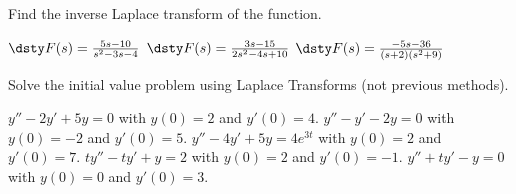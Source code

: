 \clearpage

\ii Find the inverse Laplace transform of the function.\label{17problem5}

\bb
\ii $\dsty F(s) = \frac{5s-10}{s^2-3s-4}$ \label{17problem5a}
\vfill
\ii $\dsty F(s) = \frac{3s-15}{2s^2-4s+10}$ \label{17problem5b}
\vfill
\ii $\dsty F(s) = \frac{-5s-36}{(s+2)(s^2+9)}$ \label{17problem5c}
\vfill
\ee

\clearpage
{}

\ii Solve the initial value problem using Laplace Transforms (not previous methods).  \label{17problem6}

\bb
\ii $y''-2y'+5y=0$ with $y(0)=2$ and $y'(0)=4$. \label{17problem6a}
\vfill
\ii $y''-y'-2y=0$ with $y(0)=-2$ and $y'(0)=5$. \label{17problem6b} %
\vfill
\clearpage
\ii $y''-4y'+5y=4e^{3t}$ with $y(0)=2$ and $y'(0)=7$. \label{17problem6c} %
\vfill
\ii $ty''-ty'+y=2$ with $y(0)=2$ and $y'(0)=-1$. \label{17problem6d}
\vfill
\clearpage
\ii $y''+ty'-y=0$ with $y(0)=0$ and $y'(0)=3$. \label{17problem6e}
\vfill
\ee
\ee
